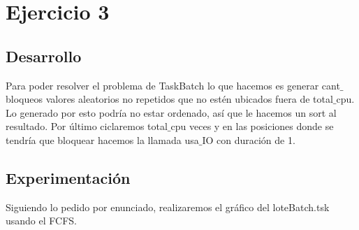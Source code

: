 
\section{Ejercicio 3}

\subsection{Desarrollo}
Para poder resolver el problema de TaskBatch lo que hacemos es generar cant$\_$bloqueos valores aleatorios no repetidos que no estén ubicados fuera de total$\_$cpu. Lo generado por esto podría no estar ordenado, así que le hacemos un sort al resultado. Por último ciclaremos total$\_$cpu veces y en las posiciones donde se tendría que bloquear hacemos la llamada usa$\_$IO con duración de 1.

\subsection{Experimentación}
Siguiendo lo pedido por enunciado, realizaremos el gráfico del loteBatch.tsk usando el FCFS. 